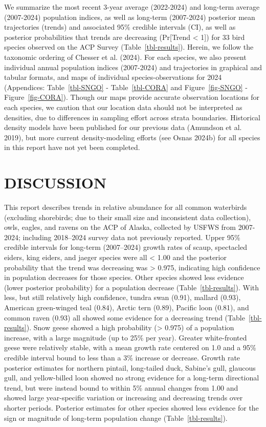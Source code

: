 \documentclass[
]{article}
\begin{document}
We summarize the most recent 3-year average (2022-2024) and long-term
average (2007-2024) population indices, as well as long-term (2007-2024)
posterior mean trajectories (trends) and associated 95\% credible
intervals (CI), as well as posterior probabilities that trends are
decreasing (Pr{[}Trend \textless{} 1{]}) for 33 bird species observed on
the ACP Survey (Table~\ref{tbl-results}). Herein, we follow the
taxonomic ordering of Chesser et al. (2024). For each species, we also
present individual annual population indices (2007-2024) and
trajectories in graphical and tabular formats, and maps of individual
species-observations for 2024 (Appendices: Table~\ref{tbl-SNGO} -
Table~\ref{tbl-CORA} and Figure~\ref{fig-SNGO} - Figure~\ref{fig-CORA}).
Though our maps provide accurate observation locations for each species,
we caution that our location data should not be interpreted as
densities, due to differences in sampling effort across strata
boundaries. Historical density models have been published for our
previous data (Amundson et al. 2019), but more current density-modeling
efforts (see Osnas 2024b) for all species in this report have not yet
been completed.

\section*{DISCUSSION}\label{discussion}

This report describes trends in relative abundance for all common
waterbirds (excluding shorebirds; due to their small size and
inconsistent data collection), owls, eagles, and ravens on the ACP of
Alaska, collected by USFWS from 2007-2024; including 2018--2024 survey
data not previously reported. Upper 95\% credible intervals for
long-term (2007--2024) growth rates of scaup, spectacled eiders, king
eiders, and jaeger species were all \textless{} 1.00 and the posterior
probability that the trend was decreasing was \textgreater{} 0.975,
indicating high confidence in population decreases for those species.
Other species showed less evidence (lower posterior probability) for a
population decrease (Table~\ref{tbl-results}). With less, but still
relatively high confidence, tundra swan (0.91), mallard (0.93), American
green-winged teal (0.84), Arctic tern (0.89), Pacific loon (0.81), and
common raven (0.93) all showed some evidence for a decreasing trend
(Table~\ref{tbl-results}). Snow geese showed a high probability
(\textgreater{} 0.975) of a population increase, with a large magnitude
(up to 25\% per year). Greater white-fronted geese were relatively
stable, with a mean growth rate centered on 1.0 and a 95\% credible
interval bound to less than a 3\% increase or decrease. Growth rate
posterior estimates for northern pintail, long-tailed duck, Sabine's
gull, glaucous gull, and yellow-billed loon showed no strong evidence
for a long-term directional trend, but were instead bound to within 5\%
annual changes from 1.00 and showed large year-specific variation or
increasing and decreasing trends over shorter periods. Posterior
estimates for other species showed less evidence for the sign or
magnitude of long-term population change (Table~\ref{tbl-results}).
\end{document}
